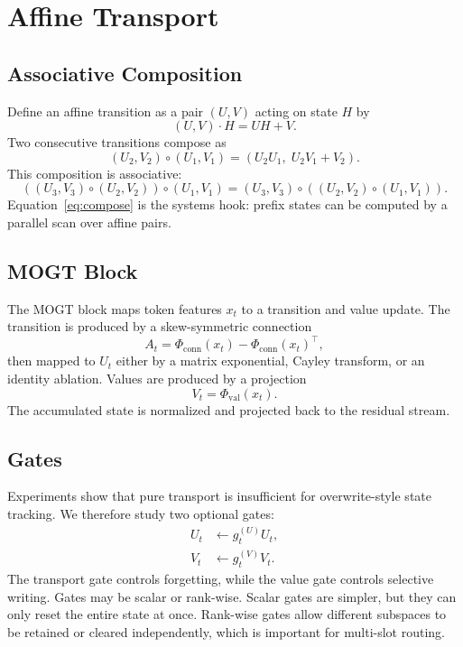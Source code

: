 \documentclass[10pt]{article}
\newcommand{\mogt}{MOGT}
\begin{document}
\section{Affine Transport}

\subsection{Associative Composition}

Define an affine transition as a pair $(U,V)$ acting on state $H$ by
\[
    (U,V) \cdot H = UH + V.
\]
Two consecutive transitions compose as
\begin{equation}
    (U_2,V_2) \circ (U_1,V_1)
    =
    (U_2 U_1,\; U_2 V_1 + V_2).
    \label{eq:compose}
\end{equation}
This composition is associative:
\[
    ((U_3,V_3)\circ(U_2,V_2))\circ(U_1,V_1)
    =
    (U_3,V_3)\circ((U_2,V_2)\circ(U_1,V_1)).
\]
Equation~\ref{eq:compose} is the systems hook: prefix states can be computed by
a parallel scan over affine pairs.

\subsection{MOGT Block}

The \mogt{} block maps token features $x_t$ to a transition and value update.
The transition is produced by a skew-symmetric connection
\[
    A_t = \Phi_{\mathrm{conn}}(x_t)
          - \Phi_{\mathrm{conn}}(x_t)^\top,
\]
then mapped to $U_t$ either by a matrix exponential, Cayley transform, or an
identity ablation. Values are produced by a projection
\[
    V_t = \Phi_{\mathrm{val}}(x_t).
\]
The accumulated state is normalized and projected back to the residual stream.

\subsection{Gates}

Experiments show that pure transport is insufficient for overwrite-style state
tracking. We therefore study two optional gates:
\begin{align}
    U_t &\leftarrow g^{(U)}_t U_t, \\
    V_t &\leftarrow g^{(V)}_t V_t.
\end{align}
The transport gate controls forgetting, while the value gate controls selective
writing. Gates may be scalar or rank-wise. Scalar gates are simpler, but they
can only reset the entire state at once. Rank-wise gates allow different
subspaces to be retained or cleared independently, which is important for
multi-slot routing.
\end{document}
